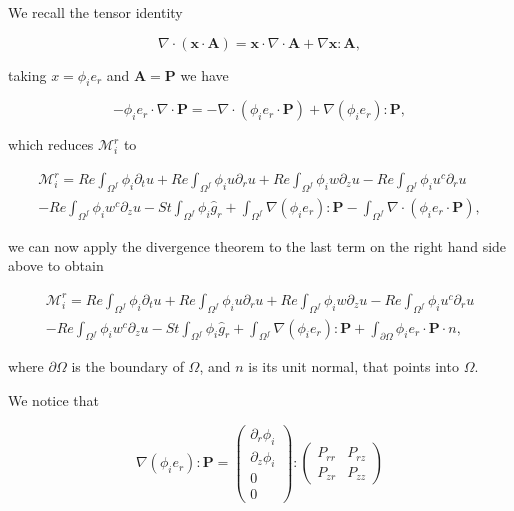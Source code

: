 \documentclass{article}
\begin{document}
We recall the tensor identity

\begin{equation}
\nabla \cdot (\pmb {x}\cdot \pmb {A}) = \pmb {x}\cdot \nabla \cdot \pmb {A} + \nabla \pmb {x}:\pmb {A}, \tag{4.2}
\end{equation}

taking \(x = \phi_{i}e_{r}\) and \(\pmb {A} = \pmb{P}\) we have

\begin{equation}
-\phi_{i}e_{r}\cdot \nabla \cdot \pmb {P} = -\nabla \cdot (\phi_{i}e_{r}\cdot \pmb {P}) + \nabla (\phi_{i}e_{r}):\pmb {P}, \tag{4.3}
\end{equation}

which reduces \(\mathcal{M}_i^r\) to

\begin{equation}
\begin{array}{l} \mathcal{M}_i^r = Re\int_{\Omega^f}\phi_i\partial_tu + Re\int_{\Omega^f}\phi_iu\partial_r u + Re\int_{\Omega^f}\phi_iw\partial_z u - Re\int_{\Omega^f}\phi_iu^c\partial_r u \\ - Re\int_{\Omega^f}\phi_iw^c\partial_z u - St\int_{\Omega^f}\phi_i\hat{g}_r + \int_{\Omega^f}\nabla(\phi_ie_r):\pmb {P} - \int_{\Omega^f}\nabla\cdot (\phi_ie_r\cdot \pmb {P}), \end{array} \tag{4.4}
\end{equation}

we can now apply the divergence theorem to the last term on the right hand side above to obtain

\begin{equation}
\begin{array}{l} \mathcal{M}_i^r = Re\int_{\Omega^f}\phi_i\partial_tu + Re\int_{\Omega^f}\phi_iu\partial_r u + Re\int_{\Omega^f}\phi_iw\partial_z u - Re\int_{\Omega^f}\phi_iu^c\partial_r u \\ - Re\int_{\Omega^f}\phi_iw^c\partial_z u - St\int_{\Omega^f}\phi_i\hat{g}_r + \int_{\Omega^f}\nabla(\phi_ie_r):\pmb {P} + \int_{\partial\Omega}\phi_ie_r\cdot \pmb {P}\cdot n, \end{array} \tag{4.5}
\end{equation}

where \(\partial\Omega\) is the boundary of \(\Omega\), and \(n\) is its unit normal, that points into \(\Omega\).

We notice that

\begin{equation}
\nabla(\phi_ie_r):\pmb {P} = \begin{pmatrix} \partial_r\phi_i \\ \partial_z\phi_i \\ 0 \\ 0 \end{pmatrix} : \begin{pmatrix} P_{rr} & P_{rz} \\ P_{zr} & P_{zz} \end{pmatrix} \tag{4.6}
\end{equation}
\end{document}
